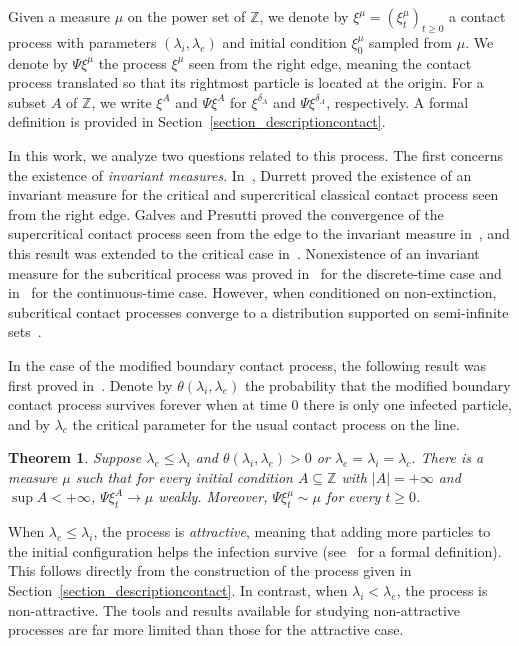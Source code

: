 \documentclass[11pt,a4paper]{article}
\theoremstyle{plain}
\newtheorem{theorem}{Theorem}[section]
\theoremstyle{definition}
\theoremstyle{remark}
\numberwithin{equation}{section}
\begin{document}
	Given a measure $\mu$ on the power set of $\mathbb{Z}$, we denote by $\xi^{\mu}=(\xi_t^{\mu})_{t \ge 0}$ a contact process with parameters $(\lambda_i, \lambda_e)$ and initial condition $\xi^{\mu}_0$ sampled from $\mu$. We denote by $\Psi \xi^{\mu}$ the process $\xi^\mu$ seen from the right edge, meaning the contact process translated so that its rightmost particle is located at the origin. For a subset $A$ of $\mathbb{Z}$, we write $\xi^A$ and $\Psi \xi^A$ for $\xi^{\delta_A}$ and $\Psi \xi^{\delta_A}$, respectively. A formal definition is provided in Section~\ref{section_descriptioncontact}.
	
	In this work, we analyze two questions related to this process. The first concerns the existence of \emph{invariant measures}. In~\cite{Durrett84}, Durrett proved the existence of an invariant measure for the critical and supercritical classical contact process seen from the right edge. Galves and Presutti proved the convergence of the supercritical contact process seen from the edge to the invariant measure in~\cite{GalvesPresutti87}, and this result was extended to the critical case in~\cite{CoxDurrettSchinazi91}. Nonexistence of an invariant measure for the subcritical process was proved in~\cite{Schonmann87} for the discrete-time case and in~\cite{ASS90} for the continuous-time case. However, when conditioned on non-extinction, subcritical contact processes converge to a distribution supported on semi-infinite sets~\cite{AEGR15}.
	
	In the case of the modified boundary contact process, the following result was first proved in~\cite{AndjelRolla23}.
	Denote by $\theta(\lambda_i,\lambda_e)$ the probability that the modified boundary contact process survives forever when at time $0$ there is only one infected particle, and by $\lambda_c$ the critical parameter for the usual contact process on the line.
	\begin{theorem} \label{thm_andjelrolla}
		Suppose $\lambda_e \le \lambda_i$ and $\theta(\lambda_i, \lambda_e)>0$ or $\lambda_e=\lambda_i = \lambda_c$. There is a measure $\mu$ such that for every initial condition $A \subseteq \mathbb{Z}$ with $|A|=+\infty$ and $\sup A < +\infty$, $\Psi \xi^A_t \rightarrow \mu$ weakly. Moreover, $\Psi \xi^{\mu}_t \sim \mu$ for every $t \ge 0$.
	\end{theorem}
	
	When $\lambda_e \le \lambda_i$, the process is \emph{attractive}, meaning that adding more particles to the initial configuration helps the infection survive (see~\cite[Chapter III]{Liggett05} for a formal definition). This follows directly from the construction of the process given in Section~\ref{section_descriptioncontact}. In contrast, when $\lambda_i < \lambda_e$, the process is non-attractive. The tools and results available for studying non-attractive processes are far more limited than those for the attractive case.
	
\end{document}
